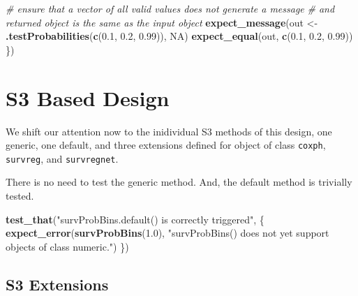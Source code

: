 \documentclass[
]{book}
\newenvironment{Shaded}{\begin{snugshade}}{\end{snugshade}}
\newcommand{\CommentTok}[1]{\textcolor[rgb]{0.56,0.35,0.01}{\textit{#1}}}
\newcommand{\ConstantTok}[1]{\textcolor[rgb]{0.56,0.35,0.01}{#1}}
\newcommand{\FloatTok}[1]{\textcolor[rgb]{0.00,0.00,0.81}{#1}}
\newcommand{\FunctionTok}[1]{\textcolor[rgb]{0.13,0.29,0.53}{\textbf{#1}}}
\newcommand{\NormalTok}[1]{#1}
\newcommand{\OtherTok}[1]{\textcolor[rgb]{0.56,0.35,0.01}{#1}}
\newcommand{\StringTok}[1]{\textcolor[rgb]{0.31,0.60,0.02}{#1}}
\begin{document}
\begin{Shaded}
\begin{Highlighting}[]
  \CommentTok{\# ensure that a vector of all valid values does not generate a message}
  \CommentTok{\# and returned object is the same as the input object}
  \FunctionTok{expect\_message}\NormalTok{(out }\OtherTok{\textless{}{-}} \FunctionTok{.testProbabilities}\NormalTok{(}\FunctionTok{c}\NormalTok{(}\FloatTok{0.1}\NormalTok{, }\FloatTok{0.2}\NormalTok{, }\FloatTok{0.99}\NormalTok{)), }\ConstantTok{NA}\NormalTok{)}
  \FunctionTok{expect\_equal}\NormalTok{(out, }\FunctionTok{c}\NormalTok{(}\FloatTok{0.1}\NormalTok{, }\FloatTok{0.2}\NormalTok{, }\FloatTok{0.99}\NormalTok{))}
\NormalTok{\})}
\end{Highlighting}
\end{Shaded}

\hypertarget{s3-based-design}{%
\section{S3 Based Design}\label{s3-based-design}}

We shift our attention now to the inidividual S3 methods of this design, one generic, one default, and three extensions defined for object of class \texttt{coxph}, \texttt{survreg}, and \texttt{survregnet}.

There is no need to test the generic method. And, the default method is trivially tested.

\begin{Shaded}
\begin{Highlighting}[]
\FunctionTok{test\_that}\NormalTok{(}\StringTok{"\textasciigrave{}survProbBins.default()\textasciigrave{} is correctly triggered"}\NormalTok{, \{}
  \FunctionTok{expect\_error}\NormalTok{(}\FunctionTok{survProbBins}\NormalTok{(}\FloatTok{1.0}\NormalTok{),}
               \StringTok{"\textasciigrave{}survProbBins()\textasciigrave{} does not yet support objects of class \textquotesingle{}numeric\textquotesingle{}."}\NormalTok{)}
\NormalTok{\})}
\end{Highlighting}
\end{Shaded}

\hypertarget{s3-extensions-1}{%
\subsection{S3 Extensions}\label{s3-extensions-1}}
\end{document}
